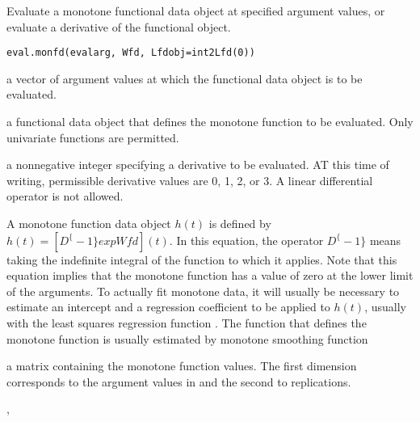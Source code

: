 \documentclass{article}
\begin{document}
\begin{Description}\relax
Evaluate a monotone functional data object at specified argument values,
or evaluate a derivative of the functional object.
\end{Description}
\begin{Usage}
\begin{verbatim}
eval.monfd(evalarg, Wfd, Lfdobj=int2Lfd(0))
\end{verbatim}
\end{Usage}
\begin{Arguments}
\begin{ldescription}
\item[\code{evalarg}] a vector of argument values at which the functional data object is to be
evaluated.

\item[\code{Wfd}] a functional data object that defines the monotone function to be
evaluated.  Only univariate functions are permitted.

\item[\code{Lfdobj}] a nonnegative integer specifying a derivative to be evaluated.  AT
this time of writing, permissible derivative values are 0, 1, 2, or 3.
A linear differential operator is not allowed.

\end{ldescription}
\end{Arguments}
\begin{Details}\relax
A monotone function data object $h(t)$ is defined by 
$h(t) = [D^\{-1\} exp Wfd](t)$.  In this equation, the operator  $D^\{-1\}$ means
taking the indefinite integral of the function to which it applies.
Note that this equation implies that the monotone function has a value
of zero at the lower limit of the arguments.  To actually fit monotone
data, it will usually be necessary to estimate an intercept and a
regression coefficient to be applied to $h(t)$, usually with the
least squares regression function .
The function  that defines the monotone function is
usually estimated by monotone smoothing function
\end{Details}
\begin{Value}
a matrix containing the monotone function
values.  The first dimension corresponds to the argument values in
 and
the second to replications.
\end{Value}
\begin{SeeAlso}\relax
{}, 
\end{SeeAlso}
\end{document}
